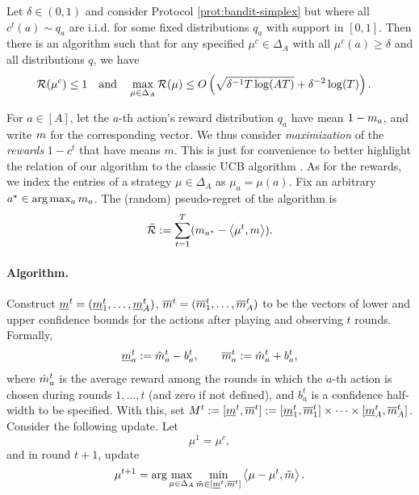 \begin{theorem}\label{thm:stochastic-case}
    Let $\delta\in(0,1)$ and consider Protocol \ref{prot:bandit-simplex} but where all $c^t(a)\sim q_a$ are i.i.d. for some fixed distributions $q_a$ with support in $[0,1]$. Then there is an algorithm such that for any specified $\mu^c\in\Delta_A$ with all $\mu^c(a)\geq \delta$ and all distributions $q$, we have
    \begin{align*}
        \mathcal{R}(\mu^c) \leq 1 \quad \text{and}\quad & \max_{\mu\in\Delta_A} \mathcal{R}(\mu) \leq O\left( \sqrt{\delta^{-1} T\log(AT)} + \delta^{-2}\log(T) \right).
    \end{align*}
\end{theorem}
For $a \in [A]$, let the $a$-th action's reward distribution $q_a$ have mean $1-m_a$, and write $m$ for the corresponding vector. We thus consider \emph{maximization} of the \emph{rewards} $1-c^t$ that have means $m$. This is just for convenience to better highlight the relation of our algorithm to the classic UCB algorithm \citep{lattimore2020bandit}. As for the rewards, we index the entries of a strategy $\mu\in\Delta_A$ as $\mu_a=\mu(a)$. Fix an arbitrary $a^\star \in \arg\max_a m_a$. The (random) pseudo-regret of the algorithm is 
\begin{align*}
    \tilde{\mathcal{R}} := \sum_{t=1}^T (m_{a^\star} - \left\langle \mu^t, m \right\rangle).
\end{align*}

\paragraph{Algorithm.}

Construct $\underline{m}^{t} = (\underline{m}_1^{t}, \dots, \underline{m}_A^{t})$, $\overline{m}^{t} = (\overline{m}_1^{t}, \dots, \overline{m}_A^{t})$ to be the vectors of lower and upper confidence bounds for the actions after playing and observing $t$ rounds. Formally,
\begin{align*}
    \underline{m}_a^{t} := \hat{m}_a^t - b_a^t, \quad \quad \overline{m}_a^{t} := \hat{m}_a^t + b_a^t,
\end{align*}
where $\hat{m}_a^t$ is the average reward among the rounds in which the $a$-th action is chosen during rounds $1, \dots, t$ (and zero if not defined), and $b^t_a$ is a confidence half-width to be specified. With this, set $M^t := [\underline{m}^t,\overline{m}^t] := [\underline{m}^t_1,\overline{m}^t_1] \times \cdots \times [\underline{m}^t_A,\overline{m}^t_A]$. Consider the following update. Let $$\mu^1 = \mu^c,$$ and in round $t + 1$, update 
\begin{align}
    \mu^{t+1} = \arg\max_{\mu \in \Delta_A} \min_{\tilde{m} \in [\underline{m}^t,\overline{m}^t] } \left\langle \mu-\mu^t, \tilde{m} \right\rangle . \label{eq:update}
\end{align}

